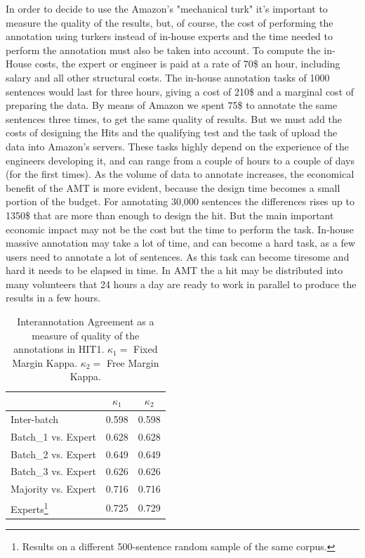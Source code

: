 \documentclass[11pt,letterpaper]{article}
\begin{document}
In order to decide to use the Amazon's "mechanical turk" it's important to measure the quality of the results, but, of course, the cost of performing the annotation using turkers instead of in-house experts and the time needed to perform the annotation must also be taken into account.
To compute the in-House costs, the expert or engineer is paid at a rate of 70\$ an hour, including salary and all other structural costs. The in-house annotation tasks of 1000 sentences would last for three hours, giving a cost of 210\$ and a marginal cost of preparing the data. By means of Amazon we spent 75\$ to annotate the same sentences three times, to get the same quality of results. But we must add the costs of designing the Hits and  the qualifying test and the task of upload the data into Amazon's servers. These tasks highly depend on the experience of the engineers developing it, and can range from a couple of hours to a couple of days (for the first times).
As the volume of data to annotate increases, the economical benefit of the AMT is more evident, because the design time becomes a small portion of the budget. For annotating 30,000 sentences the differences rises up to 1350\$ that are more than enough to design the hit. 
But the main important economic impact may not be the cost but the time to perform the task. In-house massive annotation may take a lot of time, and can become a hard task, as a few users need to annotate a lot of sentences. As this task can become tiresome and hard it needs to be elapsed in time. In AMT the a hit may be distributed into many volunteers that 24 hours a day are ready to work in parallel to produce the results in a few hours.     

\begin{table}[h]
\begin{center}
\begin{tabular}{|l|c|c|}
\hline
& $\kappa_{1}$ & $\kappa_{2}$ \\ 
\hline
Inter-batch & 0.598 & 0.598 \\ \hline
Batch\_1 vs. Expert & 0.628 & 0.628\\
Batch\_2 vs. Expert & 0.649 & 0.649\\
Batch\_3 vs. Expert & 0.626 & 0.626\\ \hline
Majority vs. Expert & 0.716 & 0.716\\ \hline
Experts\footnote{Results on a different 500-sentence random sample of the same corpus.} & 0.725 & 0.729\\ \hline
\end{tabular}
\end{center}
\label{table.ita}
\caption{Interannotation Agreement as a measure of quality of the annotations in HIT1. $\kappa_{1} = $ Fixed Margin Kappa. $\kappa_{2} = $ Free Margin Kappa.}
\end{table}
\end{document}
